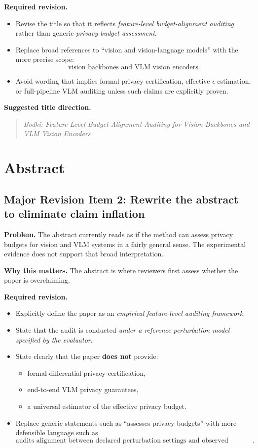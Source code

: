 \textbf{Required revision.}
\begin{itemize}
    \item Revise the title so that it reflects \emph{feature-level budget-alignment auditing} rather than generic \emph{privacy budget assessment}.
    \item Replace broad references to ``vision and vision-language models'' with the more precise scope:
    \[
    \text{vision backbones and VLM vision encoders}.
    \]
    \item Avoid wording that implies formal privacy certification, effective $\epsilon$ estimation, or full-pipeline VLM auditing unless such claims are explicitly proven.
\end{itemize}

\textbf{Suggested title direction.}
\begin{quote}
\textit{Bodhi: Feature-Level Budget-Alignment Auditing for Vision Backbones and VLM Vision Encoders}
\end{quote}

\section{Abstract}

\subsection*{Major Revision Item 2: Rewrite the abstract to eliminate claim inflation}
\textbf{Problem.} The abstract currently reads as if the method can assess privacy budgets for vision and VLM systems in a fairly general sense. The experimental evidence does not support that broad interpretation.

\textbf{Why this matters.} The abstract is where reviewers first assess whether the paper is overclaiming.

\textbf{Required revision.}
\begin{itemize}
    \item Explicitly define the paper as an \emph{empirical feature-level auditing framework}.
    \item State that the audit is conducted \emph{under a reference perturbation model specified by the evaluator}.
    \item State clearly that the paper \textbf{does not} provide:
    \begin{itemize}
        \item formal differential privacy certification,
        \item end-to-end VLM privacy guarantees,
        \item a universal estimator of the effective privacy budget.
    \end{itemize}
    \item Replace generic statements such as ``assesses privacy budgets'' with more defensible language such as
    \[
    \text{audits alignment between declared perturbation settings and observed feature-level perturbation patterns}.
    \]
\end{itemize}

